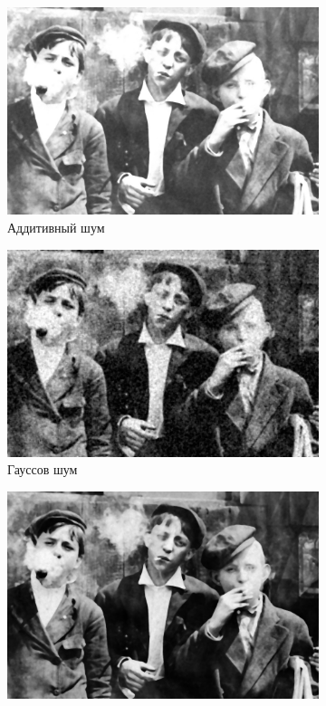 \begin{figure}[ht!]
\begin{subfigure}[b]{0.5\linewidth}
      \includegraphics[width=0.95\linewidth]{../Median_FIlter/Median_Additive_noise_(k=7).jpg} 
      \caption{Аддитивный шум} 
      \label{median_7:c} 
      \vspace{4ex}
    \end{subfigure}%
    \begin{subfigure}[b]{0.5\linewidth}
      \centering
      \includegraphics[width=0.95\linewidth]{../Median_FIlter/Median_Gaussian_noise_(k=7).jpg} 
      \caption{Гауссов шум} 
      \label{median_7:d} 
      \vspace{4ex}
    \end{subfigure}
    \begin{subfigure}[b]{0.5\linewidth}
      \centering
      \includegraphics[width=0.95\linewidth]{../Median_FIlter/Median_Poisson_noise_(k=7).jpg} 

\end{subfigure}
\end{figure}
